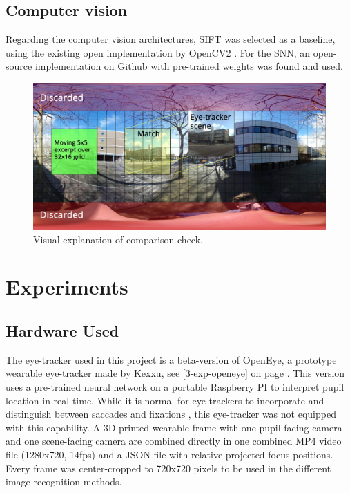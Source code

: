 \documentclass[sigconf, natbib=false, nonacm]{acmart}
\begin{document}
    \subsection{Computer vision}
    Regarding the computer vision architectures, SIFT was selected as a baseline, using the existing open implementation by OpenCV2 \cite{OpenCV2020, OpenCV2020a}. For the SNN, an open-source implementation on Github with pre-trained weights was found and used\footnotemark.

    \begin{figure}
        \includegraphics[width=\linewidth]{figures/2-met-movinggrid.jpg}
        \caption{Visual explanation of comparison check.}
        \label{2-met-movinggrid}
    \end{figure}
    
\section{Experiments}
    \subsection{Hardware Used}
    The eye-tracker used in this project is a beta-version of OpenEye, a prototype wearable eye-tracker made by Kexxu, see \autoref{3-exp-openeye} on page \pageref{3-exp-openeye}. This version uses a pre-trained neural network on a portable Raspberry PI to interpret pupil location in real-time\footnotemark. While it is normal for eye-trackers to incorporate and distinguish between saccades and fixations \cite{VanGompel2007}, this eye-tracker was not equipped with this capability. A 3D-printed wearable frame with one pupil-facing camera and one scene-facing camera are combined directly in one combined MP4 video file (1280x720, 14fps) and a JSON file with relative projected focus positions. Every frame was center-cropped to 720x720 pixels to be used in the different image recognition methods. 
        
\end{document}
